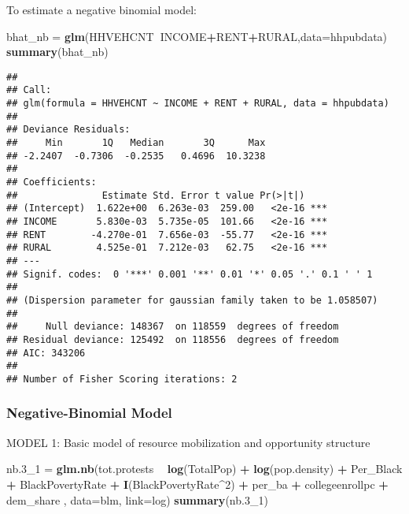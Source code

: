 \documentclass[
]{article}
\newenvironment{Shaded}{\begin{snugshade}}{\end{snugshade}}
\newcommand{\DataTypeTok}[1]{\textcolor[rgb]{0.13,0.29,0.53}{#1}}
\newcommand{\DecValTok}[1]{\textcolor[rgb]{0.00,0.00,0.81}{#1}}
\newcommand{\FloatTok}[1]{\textcolor[rgb]{0.00,0.00,0.81}{#1}}
\newcommand{\KeywordTok}[1]{\textcolor[rgb]{0.13,0.29,0.53}{\textbf{#1}}}
\newcommand{\NormalTok}[1]{#1}
\newcommand{\OperatorTok}[1]{\textcolor[rgb]{0.81,0.36,0.00}{\textbf{#1}}}
\newcommand{\StringTok}[1]{\textcolor[rgb]{0.31,0.60,0.02}{#1}}
\begin{document}
To estimate a negative binomial model:

\begin{Shaded}
\begin{Highlighting}[]
\NormalTok{bhat_nb =}\StringTok{ }\KeywordTok{glm}\NormalTok{(HHVEHCNT}\OperatorTok{~}\NormalTok{INCOME}\OperatorTok{+}\NormalTok{RENT}\OperatorTok{+}\NormalTok{RURAL,}\DataTypeTok{data=}\NormalTok{hhpubdata)}
\KeywordTok{summary}\NormalTok{(bhat_nb)}
\end{Highlighting}
\end{Shaded}

\begin{verbatim}
## 
## Call:
## glm(formula = HHVEHCNT ~ INCOME + RENT + RURAL, data = hhpubdata)
## 
## Deviance Residuals: 
##     Min       1Q   Median       3Q      Max  
## -2.2407  -0.7306  -0.2535   0.4696  10.3238  
## 
## Coefficients:
##               Estimate Std. Error t value Pr(>|t|)    
## (Intercept)  1.622e+00  6.263e-03  259.00   <2e-16 ***
## INCOME       5.830e-03  5.735e-05  101.66   <2e-16 ***
## RENT        -4.270e-01  7.656e-03  -55.77   <2e-16 ***
## RURAL        4.525e-01  7.212e-03   62.75   <2e-16 ***
## ---
## Signif. codes:  0 '***' 0.001 '**' 0.01 '*' 0.05 '.' 0.1 ' ' 1
## 
## (Dispersion parameter for gaussian family taken to be 1.058507)
## 
##     Null deviance: 148367  on 118559  degrees of freedom
## Residual deviance: 125492  on 118556  degrees of freedom
## AIC: 343206
## 
## Number of Fisher Scoring iterations: 2
\end{verbatim}

\hypertarget{negative-binomial-model}{%
\subsubsection{Negative-Binomial Model}\label{negative-binomial-model}}

MODEL 1: Basic model of resource mobilization and opportunity structure

\begin{Shaded}
\begin{Highlighting}[]
\NormalTok{nb}\FloatTok{.3}\NormalTok{_}\DecValTok{1}\NormalTok{ =}\StringTok{ }\KeywordTok{glm.nb}\NormalTok{(tot.protests }\OperatorTok{~}\StringTok{ }\KeywordTok{log}\NormalTok{(TotalPop) }\OperatorTok{+}\StringTok{ }\KeywordTok{log}\NormalTok{(pop.density) }\OperatorTok{+}\StringTok{ }\NormalTok{Per_Black }\OperatorTok{+}\StringTok{ }\NormalTok{BlackPovertyRate }\OperatorTok{+}\StringTok{ }\KeywordTok{I}\NormalTok{(BlackPovertyRate}\OperatorTok{^}\DecValTok{2}\NormalTok{) }\OperatorTok{+}\StringTok{ }\NormalTok{per_ba }\OperatorTok{+}\StringTok{ }\NormalTok{collegeenrollpc }\OperatorTok{+}\StringTok{ }\NormalTok{dem_share , }\DataTypeTok{data=}\NormalTok{blm, }\DataTypeTok{link=}\NormalTok{log)}
\KeywordTok{summary}\NormalTok{(nb}\FloatTok{.3}\NormalTok{_}\DecValTok{1}\NormalTok{) }
\end{Highlighting}
\end{Shaded}
\end{document}
